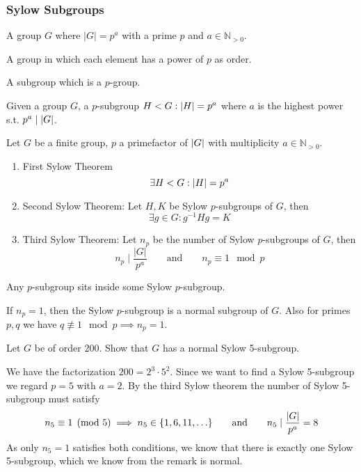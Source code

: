 \subsubsection{Sylow Subgroups}
\begin{definition}[\(p\)-Group]
   A group \(G\) where \(|G| = p^a\) with a prime \(p\) and \(a \in \mathbb{N}_{>0}\).
\end{definition}
\begin{remark}
   A group in which each element has a power of \(p\) as order.
\end{remark}

\begin{definition}[\(p\)-Subgroup]
   A subgroup which is a \(p\)-group.
\end{definition}

\begin{definition}
   Given a group \(G\), a \(p\)-subgroup \(H < G: \left\lvert H\right\rvert = p^a\) where \(a\) is the highest power s.t. \(p^a \mid \left\lvert G\right\rvert\).
\end{definition}

\begin{theorem}
   Let \(G\) be a finite group, \(p\) a primefactor of \(\left\lvert G\right\rvert\) with multiplicity \(a \in \mathbb{N}_{>0}\).
   \begin{enumerate}[label=\roman*, align=Center]
      \item First Sylow Theorem
         \[\exists H < G: \left\lvert H\right\rvert = p^a\]
      \item Second Sylow Theorem: Let \(H, K\) be Sylow \(p\)-subgroups of \(G\), then
         \[\exists g \in G: g^{-1}Hg = K\]
      \item Third Sylow Theorem: Let \(n_p\) be the number of Sylow \(p\)-subgroups of \(G\), then
         \[n_p \mid \frac{|G|}{p^a} \qquad\text{and}\qquad n_p \equiv 1 \mod p\]
   \end{enumerate}
\end{theorem}
\begin{remark}[ii]
   Any \(p\)-subgroup sits inside some Sylow \(p\)-subgroup.
\end{remark}
\begin{remark}[iii]
   If \(n_p = 1\), then the Sylow \(p\)-subgroup is a normal subgroup of \(G\).
   Also for primes \(p, q\) we have \(q \not\equiv 1 \mod p \implies n_p = 1\).
\end{remark}
\begin{example}
   Let \(G\) be of order 200.
   Show that \(G\) has a normal Sylow 5-subgroup.

   We have the factorization \(200 = 2^3 \cdot 5^2\).
   Since we want to find a Sylow 5-subgroup we regard \(p = 5\) with \(a = 2\).
   By the third Sylow theorem the number of Sylow 5-subgroup must satisfy
   \[n_5 \equiv 1 \pmod{5} \implies n_5 \in \{1, 6, 11, \ldots\} \qquad\text{and}\qquad n_5 \mid \frac{\left\lvert G\right\rvert}{p^a} = 8\]
   As only \(n_5 = 1\) satisfies both conditions, we know that there is exactly one Sylow 5-subgroup, which we know from the remark is normal.
\end{example}

